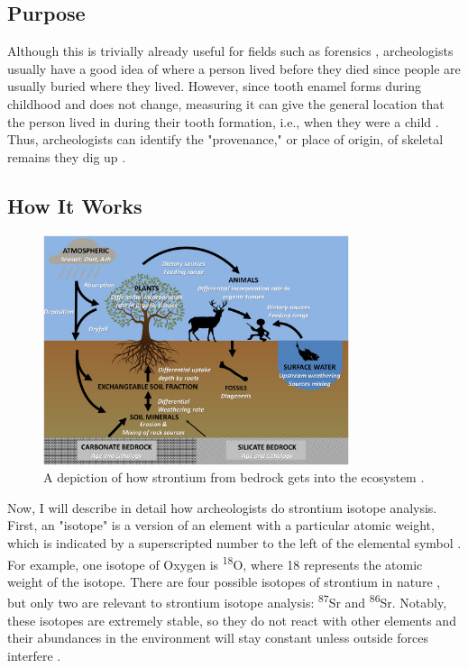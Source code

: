\documentclass[a4paper, 12pt]{article}
\begin{document}
\subsection{Purpose}
Although this is trivially already useful for fields such as forensics \citep{kamenov2014},
archeologists usually have a good idea of where a person lived before they died
since people are usually buried where they lived. However, since tooth enamel
forms during childhood and does not change, measuring it can give the general location
that the person lived in during their tooth formation, i.e., when they were a child
\citep*{holt2021,kozieradzkaogunmakin2021,lazzerini2021}. Thus, archeologists can
identify the "provenance," or place of origin, of skeletal remains they dig up \citep{holt2021}.

\subsection{How It Works}
\begin{figure}[htbp]
    \centering
    \includegraphics[width=0.8\textwidth]{strontium_process.jpg}
    \caption{A depiction of how strontium from bedrock gets into the ecosystem \citep{bataille2020}.}
    \label{fig:strontium_process}
\end{figure}
Now, I will describe in detail how archeologists do strontium isotope analysis.
First, an "isotope" is a version of an element with a particular atomic weight,
which is indicated by a superscripted number to the left of the elemental symbol \citep{Meave60_2015}.
For example, one isotope of Oxygen is \textsuperscript{18}O, where 18 represents
the atomic weight of the isotope. There are four possible isotopes of strontium in
nature \citep{holt2021}, but only two are relevant to strontium isotope analysis: \textsuperscript{87}Sr and \textsuperscript{86}Sr.
Notably, these isotopes are extremely stable, so they do not react with other elements
and their abundances in the environment will stay constant unless outside forces interfere \citep{Long1998}.
\end{document}
